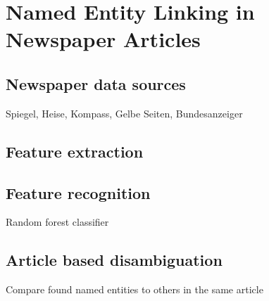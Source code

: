 \section{Named Entity Linking in Newspaper Articles}
\subsection{Newspaper data sources}
Spiegel, Heise, Kompass, Gelbe Seiten, Bundesanzeiger
\subsection{Feature extraction}
\subsection{Feature recognition}
Random forest classifier

\subsection{Article based disambiguation}
Compare found named entities to others in the same article
